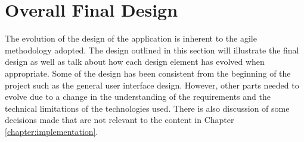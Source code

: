 \chapter{Overall Final Design}
\label{chapter:design}






The evolution of the design of the application is inherent to the agile methodology adopted. The design outlined in this section will illustrate the final design as well as talk about how each design element has evolved when appropriate. Some of the design has been consistent from the beginning of the project such as the general user interface design. However, other parts needed to evolve due to a change in the understanding of the requirements and the technical limitations of the technologies used. There is also discussion of some decisions made that are not relevant to the content in Chapter \ref{chapter:implementation}.

